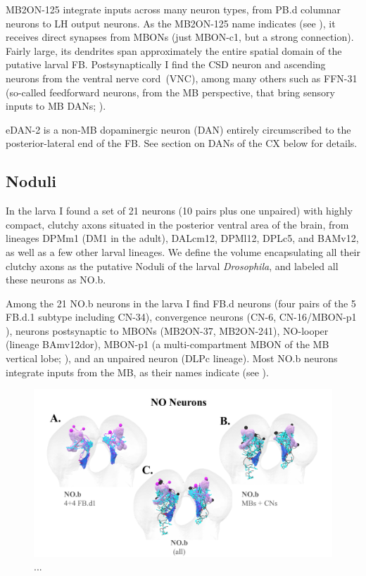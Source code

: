     MB2ON-125 integrate inputs across many neuron types, from PB.d columnar neurons to LH output neurons.
    As the MB2ON-125 name indicates (see \citep{eschbach2021circuits}), it receives direct synapses from MBONs (just MBON-c1, but a strong connection).
    Fairly large, its dendrites span approximately the entire spatial domain of the putative larval FB.
    Postsynaptically I find the CSD neuron \citep{berck2016wiring} and ascending neurons from the ventral nerve cord~(VNC), among many others such as FFN-31 (so-called feedforward neurons, from the MB perspective, that bring sensory inputs to MB DANs; \citep{eschbach2021circuits}).

    eDAN-2 is a non-MB dopaminergic neuron (DAN) entirely circumscribed to the posterior-lateral end of the FB. See section on DANs of the CX below for details.


    \subsection{Noduli}
    \label{NO}

    In the larva I found a set of 21 neurons (10 pairs plus one unpaired) with highly compact, clutchy axons situated in the posterior ventral area of the brain, from lineages DPMm1 (DM1 in the adult), DALcm12, DPMl12, DPLc5, and BAMv12, as well as a few other larval lineages.
    We define the volume encapsulating all their clutchy axons as the putative Noduli of the larval \textit{Drosophila}, and labeled all these neurons as NO.b.

    Among the 21 NO.b neurons in the larva I find FB.d neurons (four pairs of the 5 FB.d.1 subtype including CN-34), convergence neurons (CN-6, CN-16/MBON-p1 \citep{eschbach2020recurrent}), neurons postsynaptic to MBONs (MB2ON-37, MB2ON-241), NO-looper (lineage BAmv12dor), MBON-p1 (a multi-compartment MBON of the MB vertical lobe; \citep{eichler2017complete}), and an unpaired neuron (DLPc lineage). Most NO.b neurons integrate inputs from the MB, as their names indicate (see \citep{eschbach2021circuits}).

    \begin{figure}
        \centering
        \includegraphics[width=14cm]{Figs/CX/NOneurons.pdf}
        \caption[Noduli Neurons]{...}
        \label{fig:label}
    \end{figure}


